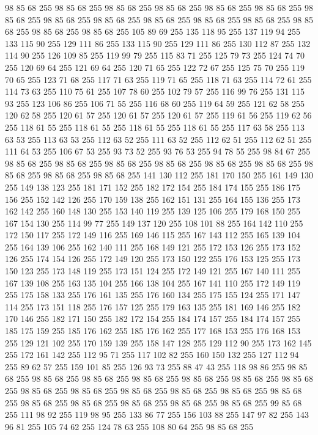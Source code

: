 98 85 68 255 98 85 68 255 98 85 68 255 98 85 68 255 98 85 68 255 98 85 68 255 98 85 68 255 98 85 68 255 98 85 68 255 98 85 68 255 98 85 68 255 98 85 68 255 98 85 68 255 98 85 68 255 98 85 68 255 105 89 69 255 135 118 95 255 137 119 94 255 133 115 90 255 129 111 86 255 133 115 90 255 129 111 86 255 130 112 87 255 132 114 90 255 126 109 85 255 119 99 79 255 115 83 71 255 125 79 73 255 124 74 70 255 120 69 64 255 121 69 64 255 120 71 65 255 122 72 67 255 125 75 70 255 119 70 65 255 123 71 68 255 117 71 63 255 119 71 65 255 118 71 63 255 114 72 61 255 114 73 63 255 110 75 61 255 107 78 60 255 102 79 57 255 116 99 76 255 131 115 93 255 123 106 86 255 106 71 55 255 116 68 60 255 119 64 59 255 121 62 58 255 120 62 58 255 120 61 57 255 120 61 57 255 120 61 57 255 119 61 56 255 119 62 56 255 118 61 55 255 118 61 55 255 118 61 55 255 118 61 55 255 117 63 58 255 113 63 53 255 113 63 53 255
112 63 52 255 111 63 52 255 112 62 51 255 112 62 51 255 111 64 53 255 106 67 53 255 93 73 52 255 93 76 53 255 94 78 55 255 98 84 67 255 98 85 68 255 98 85 68 255 98 85 68 255 98 85 68 255 98 85 68 255 98 85 68 255 98 85 68 255 98 85 68 255 98 85 68 255 141 130 112 255 181 170 150 255 161 149 130 255 149 138 123 255 181 171 152 255 182 172 154 255 184 174 155 255 186 175 156 255 152 142 126 255 170 159 138 255 162 151 131 255 164 155 136 255 173 162 142 255 160 148 130 255 153 140 119 255 139 125 106 255 179 168 150 255 167 154 130 255 114 99 77 255 149 137 120 255 108 101 88 255 164 142 110 255 172 150 117 255 172 149 116 255 169 146 115 255 167 143 112 255 165 139 104 255 164 139 106 255 162 140 111 255 168 149 121 255 172 153 126 255 173 152 126 255 174 154 126 255 172 149 120 255 173 150 122 255 176 153 125 255 173 150 123 255 173 148 119 255 173 151 124 255 172 149 121 255 167 140 111 255 167 139 108 255 163 135 104 255 166 138 104 255 167 141 110 255
172 149 119 255 175 158 133 255 176 161 135 255 176 160 134 255 175 155 124 255 171 147 114 255 173 151 118 255 176 157 125 255 179 163 135 255 181 169 146 255 182 170 146 255 182 171 150 255 182 172 154 255 184 174 157 255 184 174 157 255 185 175 159 255 185 176 162 255 185 176 162 255 177 168 153 255 176 168 153 255 129 121 102 255 170 159 139 255 158 147 128 255 129 112 90 255 173 162 145 255 172 161 142 255 112 95 71 255 117 102 82 255 160 150 132 255 127 112 94 255 89 62 57 255 159 101 85 255 126 93 73 255 88 47 43 255 118 98 86 255 98 85 68 255 98 85 68 255 98 85 68 255 98 85 68 255 98 85 68 255 98 85 68 255 98 85 68 255 98 85 68 255 98 85 68 255 98 85 68 255 98 85 68 255 98 85 68 255 98 85 68 255 98 85 68 255 98 85 68 255 98 85 68 255 98 85 68 255 98 85 68 255 99 85 68 255 111 98 92 255 119 98 95 255 133 86 77 255 156 103 88 255 147 97 82 255 143 96 81 255 105 74 62 255 124 78 63 255 108 80 64 255 98 85 68 255
